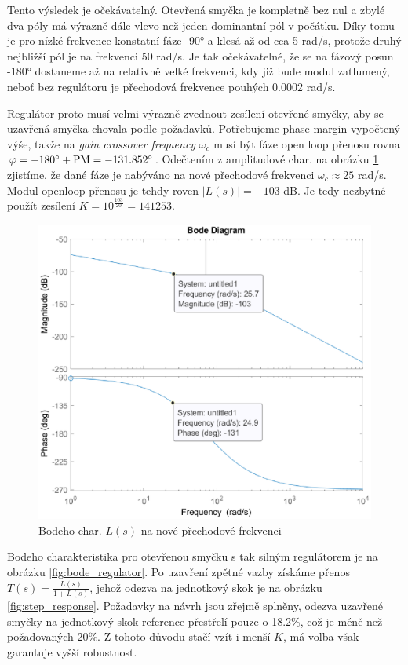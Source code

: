 \documentclass[twoside]{article}
\begin{document}
Tento výsledek je očekávatelný. Otevřená smyčka je kompletně bez nul a zbylé dva póly má výrazně dále
vlevo než jeden dominantní pól v počátku. Díky tomu je pro nízké frekvence konstatní fáze -90° a
klesá až od cca 5 rad/s, protože druhý nejbližší pól je na frekvenci 50 rad/s.
Je tak očekávatelné, že se na fázový posun -180° dostaneme až na relativně velké frekvenci,
kdy již bude modul zatlumený, neboť bez regulátoru je přechodová frekvence pouhých 0.0002 rad/s.

Regulátor proto musí velmi výrazně zvednout zesílení otevřené smyčky,
aby se uzavřená smyčka chovala podle požadavků. 
Potřebujeme phase margin vypočtený výše, takže na \textit{gain crossover frequency} $\omega_c$
musí být fáze open loop přenosu rovna $\varphi = -180\degree + \text{PM} = -131.852\degree$. Odečtením z 
amplitudové char. na obrázku \ref{fig:bode_crossover} zjistíme, že dané fáze je nabýváno na nové přechodové 
frekvenci $\omega_c \approx 25$ rad/s.
Modul openloop přenosu je tehdy roven $|L(s)| = -103$ dB. Je tedy nezbytné použít zesílení $K = 10^\frac{103}{20} = 141253$.
\begin{figure}[htbp]
	\centering
	\includegraphics[width=0.65\linewidth]{bode_crossover.eps}
	\caption{Bodeho char. $L(s)$ na nové přechodové frekvenci}
	\label{fig:bode_crossover}
\end{figure}

Bodeho charakteristika pro otevřenou smyčku s tak silným regulátorem je na obrázku \ref{fig:bode_regulator}.
Po uzavření zpětné vazby získáme přenos $T(s) =\frac{L(s)}{1+L(s)}$, jehož odezva na jednotkový skok je na obrázku \ref{fig:step_response}.
Požadavky na návrh jsou zřejmě splněny, odezva uzavřené smyčky na jednotkový skok reference přestřelí pouze o 18.2\%, 
což je méně než požadovaných 20\%. Z tohoto důvodu stačí vzít i menší $K$, má volba však garantuje vyšší robustnost.
\end{document}
